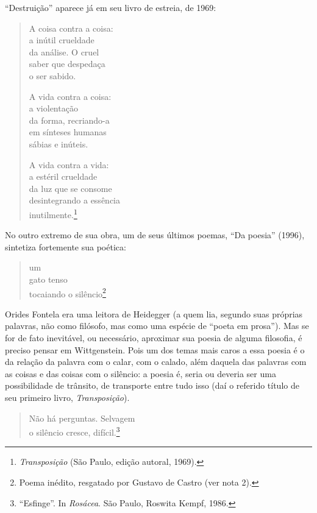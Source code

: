 ``Destruição'' aparece já em seu livro de estreia, de 1969:

\begin{verse}
A coisa contra a coisa:\\
a inútil crueldade\\
da análise. O cruel\\
saber que despedaça\\
o ser sabido.

A vida contra a coisa:\\
a violentação\\
da forma, recriando-a\\
em sínteses humanas\\
sábias e inúteis.

A vida contra a vida:\\
a estéril crueldade\\
da luz que se consome\\
desintegrando a essência\\
inutilmente.\footnote{\emph{Transposição} (São Paulo, edição autoral, 1969).}
\end{verse}

No outro extremo de sua obra, um de seus últimos poemas, ``Da poesia''
(1996), sintetiza fortemente sua poética:

\begin{verse}
um\\
gato tenso\\
tocaiando o silêncio\footnote{Poema inédito, resgatado por Gustavo de Castro (ver nota 2).}
\end{verse}

Orides Fontela era uma leitora de Heidegger (a quem lia, segundo suas
próprias palavras, não como ﬁlósofo, mas como uma espécie de ``poeta em
prosa''). Mas se for de fato inevitável, ou necessário, aproximar sua
poesia de alguma ﬁlosoﬁa, é preciso pensar em Wittgenstein. Pois um dos
temas mais caros a essa poesia é o da relação da palavra com o calar,
com o calado, além daquela das palavras com as coisas e das coisas com o
silêncio: a poesia é, seria ou deveria ser uma possibilidade de
trânsito, de transporte entre tudo isso (daí o referido título de seu
primeiro livro, \emph{Transposição}).

\begin{verse}
Não há perguntas. Selvagem\\
o silêncio cresce, difícil.\footnote{``Esﬁnge''. In \emph{Rosácea}. São Paulo, Roswita Kempf, 1986.}
\end{verse}

